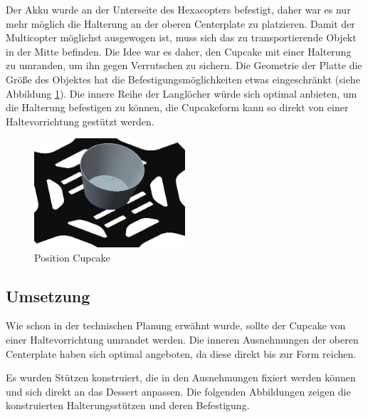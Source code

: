 		Der Akku wurde an der Unterseite des Hexacopters befestigt, daher war es nur mehr möglich die Halterung an der oberen Centerplate zu platzieren.
		Damit der Multicopter möglichst ausgewogen ist, muss sich das zu transportierende Objekt in der Mitte befinden.
		Die Idee war es daher, den Cupcake mit einer Halterung zu umranden, um ihn gegen Verrutschen zu sichern. Die Geometrie der Platte \bzw die Größe des Objektes hat die Befestigungsmöglichkeiten etwas eingeschränkt (siehe Abbildung \ref{platte_cupcake}).
		Die innere Reihe der Langlöcher würde sich optimal anbieten, um die Halterung befestigen zu können, die Cupcakeform kann so direkt von einer Haltevorrichtung gestützt werden.


			\begin{figure}[tbh]
			\begin{centering}
			\includegraphics[width = 0.5\textwidth]{Bilder/platte_cupcake}
			\par\end{centering}
			\caption{Position Cupcake}
			\label{platte_cupcake}
			\end{figure}

	\subsection{Umsetzung}

	Wie schon in der technischen Planung erwähnt wurde, sollte der Cupcake von einer Haltevorrichtung umrandet werden.
	Die inneren Ausnehmungen der oberen Centerplate haben sich optimal angeboten, da diese direkt bis zur Form reichen.

	Es wurden Stützen konstruiert, die in den Ausnehmungen fixiert werden können und sich direkt an das Dessert anpassen.
	Die folgenden Abbildungen zeigen die konstruierten Halterungsstützen und deren Befestigung.

